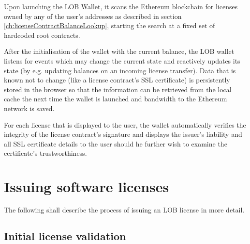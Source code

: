 \documentclass[a4paper]{article}
\begin{document}
Upon launching the LOB Wallet, it scans the Ethereum blockchain for licenses owned by any of the user's addresses as described in section \ref{ch:licenseContractBalanceLookup}, starting the search at a fixed set of hardcoded root contracts.

After the initialisation of the wallet with the current balance, the LOB wallet listens for events which may change the current state and reactively updates its state (by e.g. updating balances on an incoming license transfer). Data that is known not to change (like a license contract's SSL certificate) is persistently stored in the browser so that the information can be retrieved from the local cache the next time the wallet is launched and bandwidth to the Ethereum network is saved.

For each license that is displayed to the user, the wallet automatically verifies the integrity of the license contract's signature and displays the issuer's liability and all SSL certificate details to the user should he further wish to examine the certificate's trustworthiness.





\section{Issuing software licenses}
\label{ch:issuingSoftwareLicenses}

The following shall describe the process of issuing an LOB license in more detail. 

\subsection{Initial license validation}
\end{document}
